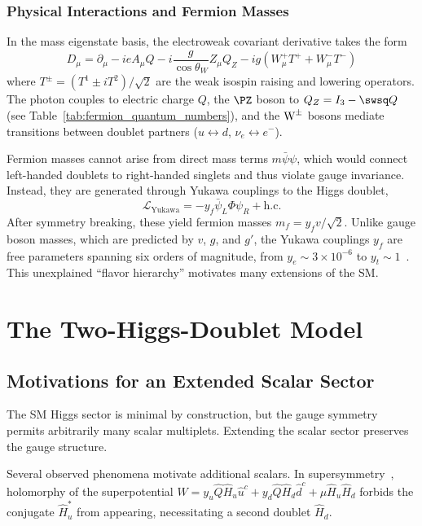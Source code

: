 \subsubsection{Physical Interactions and Fermion Masses}

In the mass eigenstate basis, the electroweak covariant derivative takes the form
\begin{equation}
D_\mu = \partial_\mu - ieA_\mu Q - i\frac{g}{\cos\theta_W}Z_\mu Q_Z - ig\left(W^+_\mu T^+ + W^-_\mu T^-\right)
\label{eq:covariant_mass_basis}
\end{equation}
where $T^\pm = (T^1 \pm iT^2)/\sqrt{2}$ are the weak isospin raising and lowering operators. The photon couples to electric charge $Q$, the $\PZ$ boson to $Q_Z = I_3 - \swsq Q$ (see Table~\ref{tab:fermion_quantum_numbers}), and the $\text{W}^\pm$ bosons mediate transitions between doublet partners ($u \leftrightarrow d$, $\nu_e \leftrightarrow e^-$).

Fermion masses cannot arise from direct mass terms $m\bar{\psi}\psi$, which would connect left-handed doublets to right-handed singlets and thus violate gauge invariance. Instead, they are generated through Yukawa couplings to the Higgs doublet,
\begin{equation}
\mathcal{L}_{\text{Yukawa}} = -y_f \bar{\psi}_L \Phi \psi_R + \text{h.c.}
\end{equation}
After symmetry breaking, these yield fermion masses $m_f = y_f v / \sqrt{2}$. Unlike gauge boson masses, which are predicted by $v$, $g$, and $g'$, the Yukawa couplings $y_f$ are free parameters spanning six orders of magnitude, from $y_e \sim 3 \times 10^{-6}$ to $y_t \sim 1$~\cite{PDG2024}. This unexplained ``flavor hierarchy'' motivates many extensions of the SM.

\section{The Two-Higgs-Doublet Model}
\label{sec:theory_2hdm}

\subsection{Motivations for an Extended Scalar Sector}
\label{sec:theory_bsm}

The SM Higgs sector is minimal by construction, but the gauge symmetry permits arbitrarily many scalar multiplets. Extending the scalar sector preserves the gauge structure.

Several observed phenomena motivate additional scalars. In supersymmetry~\cite{Martin:1997ns}, holomorphy of the superpotential $W = y_u \hat{Q}\hat{H}_u\hat{u}^c + y_d \hat{Q}\hat{H}_d\hat{d}^c + \mu\hat{H}_u\hat{H}_d$ forbids the conjugate $\hat{H}_u^*$ from appearing, necessitating a second doublet $\hat{H}_d$.

